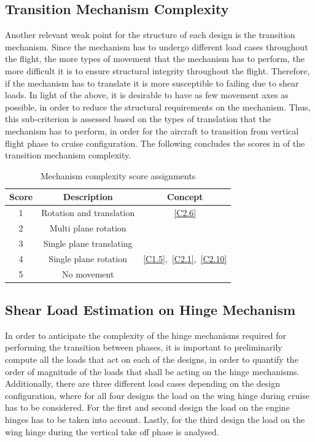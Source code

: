 \subsection{Transition Mechanism Complexity}
Another relevant weak point for the structure of each design is the transition mechanism.
Since the mechanism has to undergo different load cases throughout the flight, the more types of movement that the mechanism has to perform, the more difficult it is to ensure structural integrity throughout the flight.
Therefore, if the mechanism has to translate it is more susceptible to failing due to shear loads.
In light of the above, it is desirable to have as few movement axes as possible, in order to reduce the structural requirements on the mechanism.
Thus, this sub-criterion is assessed based on the types of translation that the mechanism has to perform, in order for the aircraft to transition from vertical flight phase to cruise configuration.
The following concludes the scores in  of the transition mechanism complexity.
\begin{table}[H]
\centering
\caption{Mechanism complexity score assignments}
\label{tab:mechcomplextoff}
\begin{tabular}{c|c|c}
\toprule
  
\textbf{Score} & \textbf{Description}     & \textbf{Concept} \\ \bottomrule
\rowcolor[HTML]{FD6864} 
1              & Rotation and translation & \ref{C2.6}              \\
\rowcolor[HTML]{FCBF7B} 
2              & Multi plane rotation     &                  \\
\rowcolor[HTML]{E0E383} 
3              & Single plane translating &              \\
\rowcolor[HTML]{A2D07F} 
4              & Single plane rotation    & \ref{C1.5},~\ref{C2.1},~\ref{C2.10}   \\
\rowcolor[HTML]{63BE7B} 
5              & No movement              &                  \\ \toprule
\end{tabular}
\end{table}

\subsection{Shear Load Estimation on Hinge Mechanism}
In order to anticipate the complexity of the hinge mechanisms required for performing the transition between phases, it is important to preliminarily compute all the loads that act on each of the designs, in order to quantify the order of magnitude of the loads that shall be acting on the hinge mechanisms.
Additionally, there are three different load cases depending on the design configuration, where for all four designs the load on the wing hinge during cruise has to be considered.
For the first and second design the load on the engine hinges has to be taken into account.
Lastly, for the third design the load on the wing hinge during the vertical take off phase is analysed.

